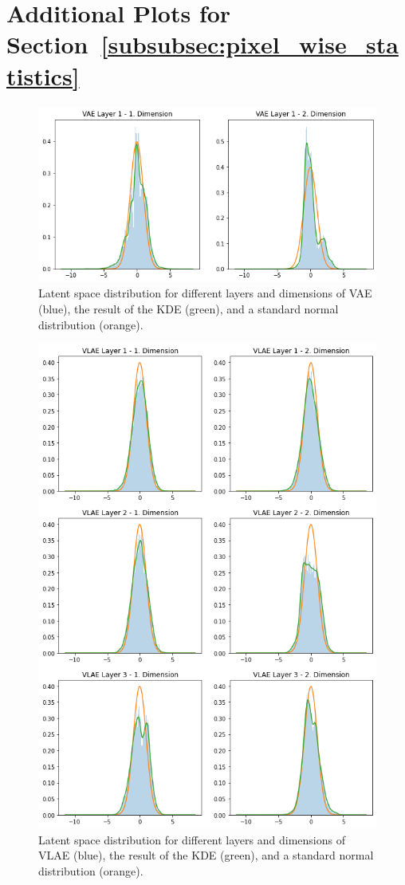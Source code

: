 \documentclass[11pt,a4paper]{article}
\let\oldsection\section
\renewcommand\section{\clearpage\oldsection}
\begin{document}
\pagebreak
\section{Additional Plots for Section~\ref{subsubsec:pixel_wise_statistics}}\label{sec:appendix_pixel_wise_statistics}

\begin{figure}[H]
\centering
\includegraphics[width=.8\textwidth]{images/generated_vs_true/vae_kde.png}
\caption[\ac{VAE} Estimated Latent Space Distribution]{Latent space distribution for different layers and dimensions of \ac{VAE} (blue), the result of the \ac{KDE} (green), and a standard normal distribution (orange).}
\end{figure}

\begin{figure}[H]
\centering
\includegraphics[width=.8\textwidth]{images/generated_vs_true/vlae_kde.png}
\caption[\ac{VLAE} Estimated Latent Space Distribution]{Latent space distribution for different layers and dimensions of \ac{VLAE} (blue), the result of the \ac{KDE} (green), and a standard normal distribution (orange).}
\end{figure}
\end{document}
